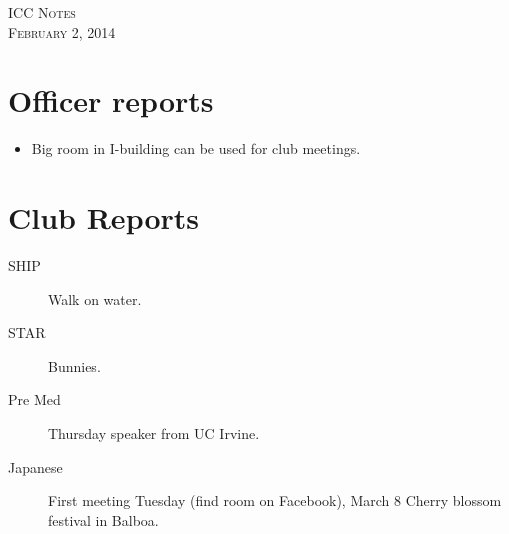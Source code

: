 \documentclass{article}
\begin{document}
\begin{center}
{\Large\scshape ICC Notes}\\[0.2cm]
{\large\scshape February 2, 2014}\\[0.4cm]
\end{center}

\section{Officer reports}
\begin{itemize}
\item Big room in I-building can be used for club meetings.
\end{itemize}

\section{Club Reports}
\begin{description}
\item[SHIP] Walk on water.
\item[STAR] Bunnies.
\item[Pre Med] Thursday speaker from UC Irvine.
\item[Japanese] First meeting Tuesday (find room on Facebook), March 8 Cherry blossom festival in Balboa.
\end{description}
\end{document}
